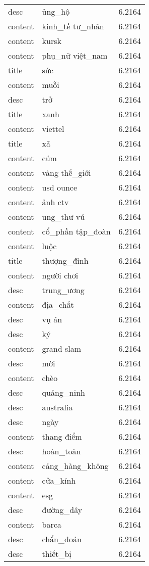 \documentclass{article}
\begin{document}
\begin{tabular}{lll}
desc & ủng\_hộ & 6.2164\\
content & kinh\_tế tư\_nhân & 6.2164\\
content & kursk & 6.2164\\
content & phụ\_nữ việt\_nam & 6.2164\\
title & sức & 6.2164\\
content & muỗi & 6.2164\\
desc & trở & 6.2164\\
title & xanh & 6.2164\\
content & viettel & 6.2164\\
title & xã & 6.2164\\
content & cúm & 6.2164\\
content & vàng thế\_giới & 6.2164\\
content & usd ounce & 6.2164\\
content & ảnh ctv & 6.2164\\
content & ung\_thư vú & 6.2164\\
content & cổ\_phần tập\_đoàn & 6.2164\\
content & luộc & 6.2164\\
title & thượng\_đỉnh & 6.2164\\
content & người chơi & 6.2164\\
desc & trung\_ương & 6.2164\\
content & địa\_chất & 6.2164\\
desc & vụ án & 6.2164\\
desc & ký & 6.2164\\
content & grand slam & 6.2164\\
desc & mời & 6.2164\\
content & chèo & 6.2164\\
desc & quảng\_ninh & 6.2164\\
desc & australia & 6.2164\\
desc & ngày & 6.2164\\
content & thang điểm & 6.2164\\
desc & hoàn\_toàn & 6.2164\\
content & cảng\_hàng\_không & 6.2164\\
content & cửa\_kính & 6.2164\\
content & esg & 6.2164\\
desc & đường\_dây & 6.2164\\
content & barca & 6.2164\\
desc & chẩn\_đoán & 6.2164\\
desc & thiết\_bị & 6.2164\\

\end{tabular}
\end{document}
